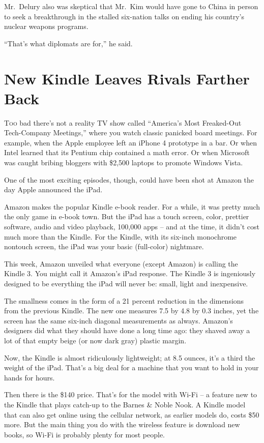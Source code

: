 ﻿\documentclass[12pt]{article}
\begin{document}
Mr.~Delury also was skeptical that Mr.~Kim would have gone to China in person to seek a breakthrough
in the stalled six-nation talks on ending his country's nuclear weapons programs.

``That's what diplomats are for,'' he said.

\pagebreak
\section{New Kindle Leaves Rivals Farther Back}

\lettrine{T}{oo} bad there's not a reality TV show called ``America's Most
Freaked-Out Tech-Company Meetings,'' where you watch classic panicked board meetings. For example,
when the Apple employee left an iPhone 4 prototype in a bar. Or when Intel learned that its Pentium
chip contained a math error. Or when Microsoft was caught bribing bloggers with \$2,500 laptops to
promote Windows Vista.

One of the most exciting episodes, though, could have been shot at Amazon the day Apple announced
the iPad.

Amazon makes the popular Kindle e-book reader. For a while, it was pretty much the only game in
e-book town. But the iPad has a touch screen, color, prettier software, audio and video playback,
100,000 apps -- and at the time, it didn't cost much more than the Kindle. For the Kindle, with its
six-inch monochrome nontouch screen, the iPad was your basic (full-color) nightmare.

This week, Amazon unveiled what everyone (except Amazon) is calling the Kindle 3. You might call it
Amazon's iPad response. The Kindle 3 is ingeniously designed to be everything the iPad will never
be: small, light and inexpensive.

The smallness comes in the form of a 21 percent reduction in the dimensions from the previous
Kindle. The new one measures 7.5 by 4.8 by 0.3 inches, yet the screen has the same six-inch diagonal
measurements as always. Amazon's designers did what they should have done a long time ago: they
shaved away a lot of that empty beige (or now dark gray) plastic margin.

Now, the Kindle is almost ridiculously lightweight; at 8.5 ounces, it's a third the weight of the
iPad. That's a big deal for a machine that you want to hold in your hands for hours.

Then there is the \$140 price. That's for the model with Wi-Fi -- a feature new to the Kindle that
plays catch-up to the Barnes \& Noble Nook. A Kindle model that can also get online using the
cellular network, as earlier models do, costs \$50 more. But the main thing you do with the wireless
feature is download new books, so Wi-Fi is probably plenty for most people.
\end{document}
